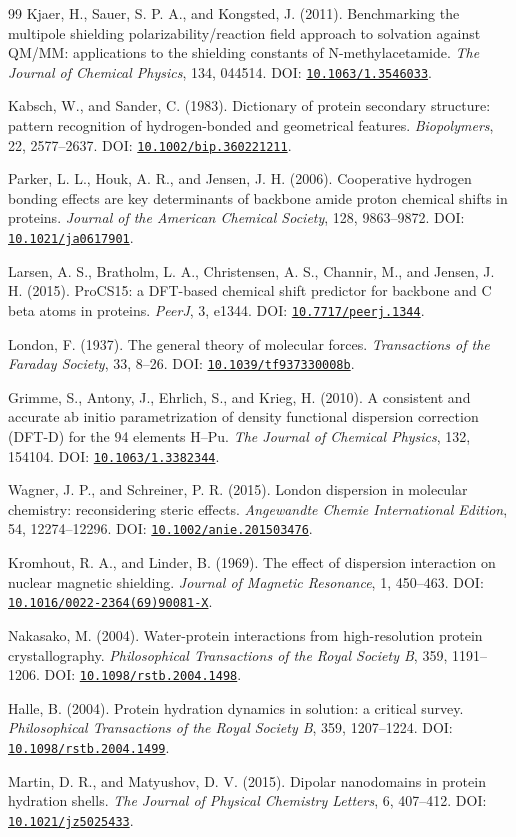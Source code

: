 \documentclass[11pt]{article}
\newcommand{\doi}[1]{\href{https://doi.org/#1}{\nolinkurl{#1}}}
\begin{document}
\begin{thebibliography}{99}
Kjaer, H., Sauer, S. P. A., and Kongsted, J. (2011).
Benchmarking the multipole shielding polarizability/reaction field approach
to solvation against QM/MM: applications to the shielding constants of
N-methylacetamide.
\emph{The Journal of Chemical Physics}, 134, 044514.
DOI: \doi{10.1063/1.3546033}.

Kabsch, W., and Sander, C. (1983).
Dictionary of protein secondary structure: pattern recognition of
hydrogen-bonded and geometrical features.
\emph{Biopolymers}, 22, 2577--2637.
DOI: \doi{10.1002/bip.360221211}.

Parker, L. L., Houk, A. R., and Jensen, J. H. (2006).
Cooperative hydrogen bonding effects are key determinants of backbone amide
proton chemical shifts in proteins.
\emph{Journal of the American Chemical Society}, 128, 9863--9872.
DOI: \doi{10.1021/ja0617901}.

Larsen, A. S., Bratholm, L. A., Christensen, A. S., Channir, M.,
and Jensen, J. H. (2015).
ProCS15: a DFT-based chemical shift predictor for backbone and C beta atoms
in proteins.
\emph{PeerJ}, 3, e1344.
DOI: \doi{10.7717/peerj.1344}.

London, F. (1937).
The general theory of molecular forces.
\emph{Transactions of the Faraday Society}, 33, 8--26.
DOI: \doi{10.1039/tf937330008b}.

Grimme, S., Antony, J., Ehrlich, S., and Krieg, H. (2010).
A consistent and accurate ab initio parametrization of density functional
dispersion correction (DFT-D) for the 94 elements H--Pu.
\emph{The Journal of Chemical Physics}, 132, 154104.
DOI: \doi{10.1063/1.3382344}.

Wagner, J. P., and Schreiner, P. R. (2015).
London dispersion in molecular chemistry: reconsidering steric effects.
\emph{Angewandte Chemie International Edition}, 54, 12274--12296.
DOI: \doi{10.1002/anie.201503476}.

Kromhout, R. A., and Linder, B. (1969).
The effect of dispersion interaction on nuclear magnetic shielding.
\emph{Journal of Magnetic Resonance}, 1, 450--463.
DOI: \doi{10.1016/0022-2364(69)90081-X}.

Nakasako, M. (2004).
Water-protein interactions from high-resolution protein crystallography.
\emph{Philosophical Transactions of the Royal Society B}, 359, 1191--1206.
DOI: \doi{10.1098/rstb.2004.1498}.

Halle, B. (2004).
Protein hydration dynamics in solution: a critical survey.
\emph{Philosophical Transactions of the Royal Society B}, 359, 1207--1224.
DOI: \doi{10.1098/rstb.2004.1499}.

Martin, D. R., and Matyushov, D. V. (2015).
Dipolar nanodomains in protein hydration shells.
\emph{The Journal of Physical Chemistry Letters}, 6, 407--412.
DOI: \doi{10.1021/jz5025433}.

\end{thebibliography}
\end{document}
